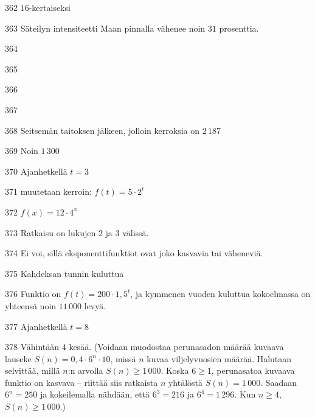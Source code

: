 \begin{Vastaus}{362}
$16$-kertaiseksi
\end{Vastaus}
\begin{Vastaus}{363}
Säteilyn intensiteetti Maan pinnalla vähenee noin $31$ prosenttia.
\end{Vastaus}
\begin{Vastaus}{364}
\end{Vastaus}
\begin{Vastaus}{365}
\end{Vastaus}
\begin{Vastaus}{366}
\end{Vastaus}
\begin{Vastaus}{367}
\end{Vastaus}
\begin{Vastaus}{368}
Seitsemän taitoksen jälkeen, jolloin kerroksia on $2\,187$
\end{Vastaus}
\begin{Vastaus}{369}
Noin $1\,300$
\end{Vastaus}
\begin{Vastaus}{370}
Ajanhetkellä $t=3$ %
\end{Vastaus}
\begin{Vastaus}{371}
muutetaan kerroin: $f(t) = 5 \cdot 2^t$
\end{Vastaus}
\begin{Vastaus}{372}
$f(x)=12\cdot 4^{x}$
\end{Vastaus}
\begin{Vastaus}{373}
Ratkaisu on lukujen $2$ ja $3$ välissä.
\end{Vastaus}
\begin{Vastaus}{374}
Ei voi, sillä eksponenttifunktiot ovat joko kasvavia tai väheneviä.
\end{Vastaus}
\begin{Vastaus}{375}
Kahdeksan tunnin kuluttua
\end{Vastaus}
\begin{Vastaus}{376}
Funktio on $f(t) = 200 \cdot 1,5^t$, ja kymmenen vuoden kuluttua kokoelmassa on yhteensä noin $11\,000$ levyä.
\end{Vastaus}
\begin{Vastaus}{377}
Ajanhetkellä $t = 8$
\end{Vastaus}
\begin{Vastaus}{378}
	Vähintään $4$ kesää. (Voidaan muodostaa perunasadon määrää kuvaava lauseke $S(n)=0,4\cdot6^n\cdot10$, missä $n$ kuvaa viljelyvuosien määrää. Halutaan selvittää, millä $n$:n arvolla $S(n)\geq1\,000$. Koska $6\geq1$, perunasatoa kuvaava funktio on kasvava -- riittää siis ratkaista $n$ yhtälöstä $S(n)=1\,000$. Saadaan $6^n=250$ ja kokeilemalla nähdään, että $6^3=216$ ja $6^4=1\,296$. Kun $n\geq4$, $S(n)\geq1\,000$.)
	
\end{Vastaus}
